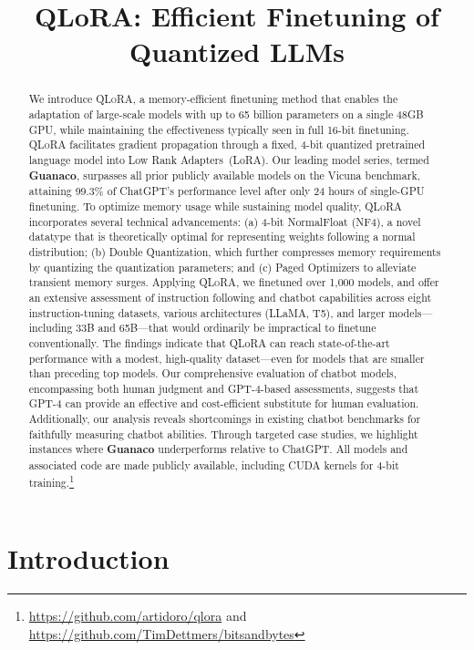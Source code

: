 \title{QLoRA: Efficient Finetuning of Quantized LLMs}

\begin{abstract}
We introduce \textsc{QLoRA}, a memory-efficient finetuning method that enables the adaptation of large-scale models with up to 65 billion parameters on a single 48GB GPU, while maintaining the effectiveness typically seen in full 16-bit finetuning. \textsc{QLoRA} facilitates gradient propagation through a fixed, 4-bit quantized pretrained language model into Low Rank Adapters~(LoRA). Our leading model series, termed \textbf{Guanaco}, surpasses all prior publicly available models on the Vicuna benchmark, attaining 99.3\% of ChatGPT's performance level after only 24 hours of single-GPU finetuning. To optimize memory usage while sustaining model quality, \textsc{QLoRA} incorporates several technical advancements: (a) 4-bit NormalFloat (NF4), a novel datatype that is theoretically optimal for representing weights following a normal distribution; (b) Double Quantization, which further compresses memory requirements by quantizing the quantization parameters; and (c) Paged Optimizers to alleviate transient memory surges. Applying \textsc{QLoRA}, we finetuned over 1,000 models, and offer an extensive assessment of instruction following and chatbot capabilities across eight instruction-tuning datasets, various architectures (LLaMA, T5), and larger models—including 33B and 65B—that would ordinarily be impractical to finetune conventionally. The findings indicate that QLoRA can reach state-of-the-art performance with a modest, high-quality dataset—even for models that are smaller than preceding top models. Our comprehensive evaluation of chatbot models, encompassing both human judgment and GPT-4-based assessments, suggests that GPT-4 can provide an effective and cost-efficient substitute for human evaluation. Additionally, our analysis reveals shortcomings in existing chatbot benchmarks for faithfully measuring chatbot abilities. Through targeted case studies, we highlight instances where \textbf{Guanaco} underperforms relative to ChatGPT. All models and associated code are made publicly available, including CUDA kernels for 4-bit training.\footnote{\url{https://github.com/artidoro/qlora} and \url{https://github.com/TimDettmers/bitsandbytes}}
\end{abstract}

\section{Introduction}

